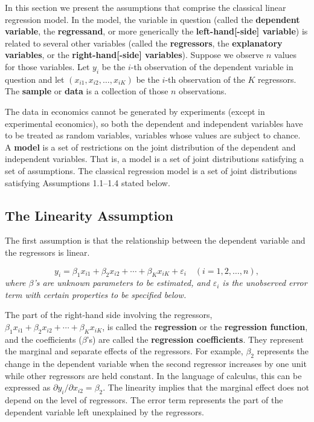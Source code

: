 
In this section we present the assumptions that comprise the classical linear regression
model.  In the model, the variable in question (called the \textbf{dependent variable},
the \textbf{regressand}, or more generically the \textbf{left-hand[-side] variable}) is
related to several other variables (called the \textbf{regressors}, the
\textbf{explanatory variables}, or the \textbf{right-hand[-side] variables}).  Suppose we
observe $n$ values for those variables.  Let $y_i$ be the $i$-th observation of the
dependent variable in question and let $(x_{i1}, x_{i2}, \ldots, x_{iK})$ be the $i$-th
observation of the $K$ regressors.  The \textbf{sample} or \textbf{data} is a collection
of those $n$ observations.

The data in economics cannot be generated by experiments (except in experimental
economics), so both the dependent and independent variables have to be treated as random
variables, variables whose values are subject to chance.  A \textbf{model} is a set of
restrictions on the joint distribution of the dependent and independent variables.  That
is, a model is a set of joint distributions satisfying a set of assumptions.  The
classical regression model is a set of joint distributions satisfying Assumptions
1.1--1.4 stated below.

\subsection*{The Linearity Assumption}

The first assumption is that the relationship between the dependent variable and the
regressors is linear.

\begin{assumption}[linearity]
\label{ass:linearity}
\begin{equation}
  y_i = \beta_1 x_{i1} + \beta_2 x_{i2} + \cdots + \beta_K x_{iK} + \varepsilon_i
  \quad (i = 1, 2, \ldots, n),
  \label{eq:1.1.1}
\end{equation}
\emph{where $\beta$'s are unknown parameters to be estimated, and $\varepsilon_i$ is the
unobserved error term with certain properties to be specified below.}
\end{assumption}

The part of the right-hand side involving the regressors,
$\beta_1 x_{i1} + \beta_2 x_{i2} + \cdots + \beta_K x_{iK}$, is called the
\textbf{regression} or the \textbf{regression function}, and the coefficients ($\beta$'s)
are called the \textbf{regression coefficients}.  They represent the marginal and separate
effects of the regressors.  For example, $\beta_2$ represents the change in the dependent
variable when the second regressor increases by one unit while other regressors are held
constant.  In the language of calculus, this can be expressed as
$\partial y_i / \partial x_{i2} = \beta_2$.  The linearity implies that the marginal
effect does not depend on the level of regressors.  The error term represents the part of
the dependent variable left unexplained by the regressors.

